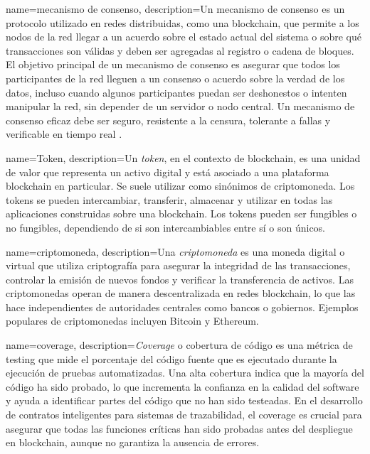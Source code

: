 {
    name=mecanismo de consenso,
    description={Un mecanismo de consenso es un protocolo utilizado en redes distribuidas, como una blockchain, que permite a los nodos de la red llegar a un acuerdo sobre el estado actual del sistema o sobre qué transacciones son válidas y deben ser agregadas al registro o cadena de bloques. El objetivo principal de un mecanismo de consenso es asegurar que todos los participantes de la red lleguen a un consenso o acuerdo sobre la verdad de los datos, incluso cuando algunos participantes puedan ser deshonestos o intenten manipular la red, sin depender de un servidor o nodo central. Un mecanismo de consenso eficaz debe ser seguro, resistente a la censura, tolerante a fallas y verificable en tiempo real \cite{diaz2022protocolos}.}
}

{
    name=Token,
    description={Un \textit{token}, en el contexto de blockchain, es una unidad de valor que representa un activo digital y está asociado a una plataforma blockchain en particular. Se suele utilizar como sinónimos de criptomoneda. Los tokens se pueden intercambiar, transferir, almacenar y utilizar en todas las aplicaciones construidas sobre una blockchain. Los tokens pueden ser fungibles o no fungibles, dependiendo de si son intercambiables entre sí o son únicos.}
}

{
    name=criptomoneda,
    description={Una \textit{criptomoneda} es una moneda digital o virtual que utiliza criptografía para asegurar la integridad de las transacciones, controlar la emisión de nuevos fondos y verificar la transferencia de activos. Las criptomonedas operan de manera descentralizada en redes blockchain, lo que las hace independientes de autoridades centrales como bancos o gobiernos. Ejemplos populares de criptomonedas incluyen Bitcoin y Ethereum.}
}

{
    name=coverage,
    description={\textit{Coverage} o  cobertura de código es una métrica de testing que mide el porcentaje del código fuente que es ejecutado durante la ejecución de pruebas automatizadas. Una alta cobertura indica que la mayoría del código ha sido probado, lo que incrementa la confianza en la calidad del software y ayuda a identificar partes del código que no han sido testeadas. En el desarrollo de contratos inteligentes para sistemas de trazabilidad, el coverage es crucial para asegurar que todas las funciones críticas han sido probadas antes del despliegue en blockchain, aunque no garantiza la ausencia de errores.}
}

